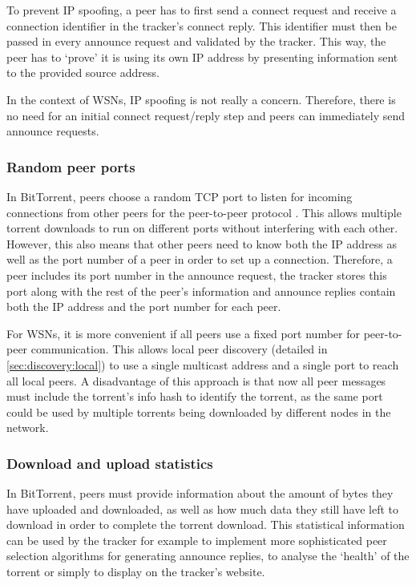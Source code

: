 To prevent \gls{IP} spoofing, a peer has to first send a connect request and receive a connection identifier in the tracker's connect reply. This identifier must then be passed in every announce request and validated by the tracker. This way, the peer has to `prove' it is using its own IP address by presenting information sent to the provided source address.

In the context of \glspl{WSN}, \gls{IP} spoofing is not really a concern. Therefore, there is no need for an initial connect request/reply step and peers can immediately send announce requests.

\subsubsection{Random peer ports}
In BitTorrent, peers choose a random \gls{TCP} port to listen for incoming connections from other peers for the peer-to-peer protocol \cite{bep3}. This allows multiple torrent downloads to run on different ports without interfering with each other. However, this also means that other peers need to know both the \gls{IP} address as well as the port number of a peer in order to set up a connection. Therefore, a peer includes its port number in the announce request, the tracker stores this port along with the rest of the peer's information and announce replies contain both the IP address and the port number for each peer.

For \glspl{WSN}, it is more convenient if all peers use a fixed port number for peer-to-peer communication. This allows local peer discovery (detailed in \ref{sec:discovery:local}) to use a single multicast address and a single port to reach all local peers. A disadvantage of this approach is that now all peer messages must include the torrent's info hash to identify the torrent, as the same port could be used by multiple torrents being downloaded by different nodes in the network.

\subsubsection{Download and upload statistics}
In BitTorrent, peers must provide information about the amount of bytes they have uploaded and downloaded, as well as how much data they still have left to download in order to complete the torrent download. This statistical information can be used by the tracker for example to implement more sophisticated peer selection algorithms for generating announce replies, to analyse the `health' of the torrent or simply to display on the tracker's website.


